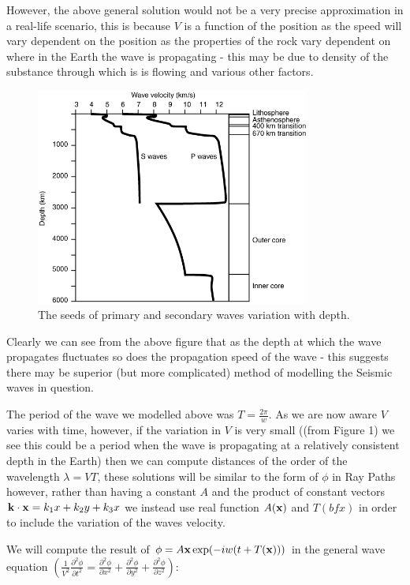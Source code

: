 \documentclass{mm2}
\begin{document}
\bigskip
\begin{answer}{2}
However, the above general solution would not be a very precise approximation in a real-life scenario, this is because $V$ is a function of the position as the speed will vary dependent on the position as the properties of the rock vary dependent on where in the Earth the wave is propagating - this may be due to density of the substance through which is is flowing and various other factors.
\begin{figure}
\centering
  \includegraphics[width=9cm]{figures/SpeedDepth.png}
  \caption{The seeds of primary and secondary waves variation with depth.}
  \label{fig:speeddepth1}
\end{figure}

Clearly we can see from the above figure that as the depth at which the wave propagates fluctuates so does the propagation speed of the wave - this suggests there may be superior (but more complicated) method of modelling the Seismic waves in question.

The period of the wave we modelled above was $T=\frac{2 \pi}{w}$. As we are now aware $V$ varies with time, however, if the variation in $V$ is very small ((from Figure 1) we see this could be a period when the wave is propagating at a relatively consistent depth in the Earth) then we can compute distances of the order of the wavelength $\lambda = VT$, these solutions will be similar to the form of $\phi$ in Ray Paths however, rather than having a constant $A$ and the product of constant vectors ${\bf k} \cdot {\bf x} = k_1x + k_2y + k_3x$ we instead use real function $A(\bf x)$ and $T(bf x)$ in order to include the variation of the waves velocity.

We will compute the result of $\phi = A{\bf x} \exp(-iw(t + T({\bf x})))$ in the general wave equation $\left( \frac{1}{V^2}\frac{\partial^2 \phi}{\partial t^2}=\frac{\partial^2 \phi}{\partial x^2}+\frac{\partial^2 \phi}{\partial y^2}+
\frac{\partial^2 \phi}{\partial z^2}\right)$:


\end{answer}
\end{document}
